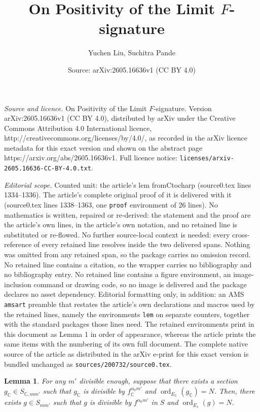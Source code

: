 \documentclass[10pt,a4paper]{amsart}
\title{On Positivity of the Limit $F$-signature}
\author{Yuchen Liu, Suchitra Pande}
\date{Source: arXiv:2605.16636v1 (CC BY 4.0)}
\newtheorem{lem}{Lemma}
\newcommand{\C}{\mathbb{C}}
\DeclareMathOperator{\ord}{ord}
\begin{document}
\maketitle

\noindent\emph{Source and licence.} On Positivity of the Limit $F$-signature. Version arXiv:2605.16636v1 (CC BY 4.0), distributed by arXiv under the Creative Commons Attribution 4.0 International licence, http://creativecommons.org/licenses/by/4.0/, as recorded in the arXiv licence metadata for this exact version and shown on the abstract page https://arxiv.org/abs/2605.16636v1. Full licence notice: \texttt{licenses/arxiv-2605.16636-CC-BY-4.0.txt}.\par\smallskip

\noindent\textit{Editorial scope.} Counted unit: the article's lem fromCtocharp (source0.tex lines 1334--1336). The article's complete original proof of it is delivered with it (source0.tex lines 1338--1363, one \texttt{proof} environment of 26 lines). No mathematics is written, repaired or re-derived: the statement and the proof are the article's own lines, in the article's own notation, and no retained line is substituted or re-flowed.  No further source-local context is needed: every cross-reference of every retained line resolves inside the two delivered spans.  Nothing was omitted from any retained span, so the package carries no omission record.  No retained line contains a citation, so the wrapper carries no bibliography and no bibliography entry.  No retained line contains a figure environment, an image-inclusion command or drawing code, so no image is delivered and the package declares no asset dependency.  Editorial formatting only, in addition: an AMS \texttt{amsart} preamble that restates the article's own declarations and macros used by the retained lines, namely the environments \texttt{lem} on separate counters, together with the standard packages those lines need.  The retained environments print in this document as Lemma 1 in order of appearance, whereas the article prints the same items with the numbering of its own full document.  The complete native source of the article as distributed in the arXiv e-print for this exact version is bundled unchanged as \texttt{sources/200732/source0.tex}.
\begin{lem} \label{fromCtocharp}
    For any $m'$ divisible enough, suppose that there exists a section $g_\C \in S_{\C,m m'}$ such that $g_\C$ is divisible by $f_{\C}^{ \alpha_0 m' }$ and $\ord_{E_\C} (g_\C) = N$. Then, there exists $g \in S_{m m'}$ such that $g$ is divisible by $f^{ \alpha_0 m' }$ in $S$ and $\ord_{E_s} (g) = N$. 
\end{lem}
\end{document}
